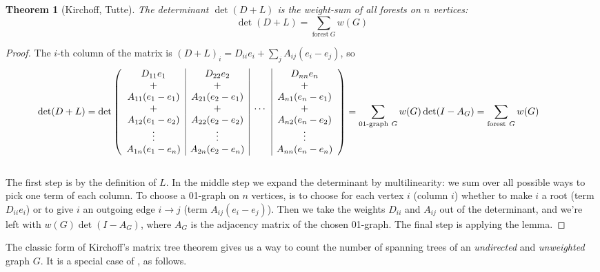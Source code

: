 \documentclass[a4paper, 11pt]{article}
\newtheorem{theorem}{Theorem}[section]
\theoremstyle{definition}
\begin{document}
\begin{theorem}[Kirchoff, Tutte] \label{thm:kirchofftutte}
  The determinant $\det(D + L)$ is the weight-sum of all forests on $n$ vertices:
  \[
    \det(D + L) = \sum_{\text{forest}\ G} w(G)
  \]
\end{theorem}
\begin{proof}
  The $i$-th column of the matrix is $(D + L)_i = D_{ii} e_i + \sum_j A_{ij}(e_i - e_j)$, so \\
  \begin{align*}
    \hspace*{-1cm}
    \det(D + L) = \det \left(
    \begin{array}{c|c|c|c}
      D_{11} e_1         & D_{22} e_2         &        & D_{nn} e_n          \\
      +                  & +                  &        & +                   \\
      A_{11} (e_1 - e_1) & A_{21} (e_2 - e_1) &        & A_{n1} (e_n - e_1)  \\
      +                  & +                  & \cdots & +                   \\
      A_{12} (e_1 - e_2) & A_{22} (e_2 - e_2) &        & A_{n2} (e_n - e_2)  \\
      \vdots             & \vdots             &        & \vdots              \\
      A_{1n} (e_1 - e_n) & A_{2n} (e_2 - e_n) &        & A_{nn} (e_n - e_n)
    \end{array} \right)
    = \sum_{\text{01-graph}\ G} w(G) \det(I - A_G)
    = \sum_{\text{forest}\ G} w(G)
  \end{align*} \\
  The first step is by the definition of $L$. In the middle step we expand the determinant by multilinearity: we sum over all possible ways to pick one term of each column. To choose a 01-graph on $n$ vertices, is to choose for each vertex $i$ (column $i$) whether to make $i$ a root (term $D_{ii} e_i$) or to give $i$ an outgoing edge $i \to j$ (term $A_{ij}(e_i - e_j)$). Then we take the weights $D_{ii}$ and $A_{ij}$ out of the determinant, and we're left with $w(G)\det(I - A_G)$, where $A_G$ is the adjacency matrix of the chosen 01-graph. The final step is applying the lemma.
\end{proof}

The classic form of Kirchoff's matrix tree theorem gives us a way to count the number of spanning trees of an \emph{undirected} and \emph{unweighted} graph $G$. It is a special case of , as follows.
\end{document}
